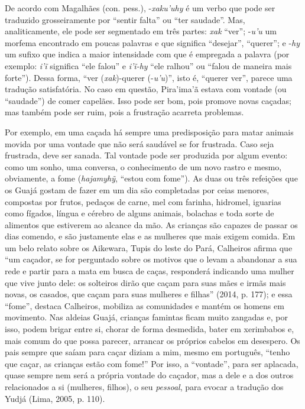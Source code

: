 De acordo com Magalhães (con. pess.), -\emph{xaku'uhy} é um verbo que
pode ser traduzido grosseiramente por ``sentir falta'' ou ``ter saudade''.
Mas, analiticamente, ele pode ser segmentado em três partes: \emph{xak}
``ver''; -\emph{u'u} um morfema encontrado em poucas palavras e que
significa ``desejar'', ``querer''; e -\emph{hy} um sufixo que indica a maior
intensidade com que é empregada a palavra (por exemplo: \emph{i'ĩ}
significa ``ele falou'' e \emph{i'ĩ-hy} ``ele ralhou'' ou ``falou de maneira
mais forte''). Dessa forma, ``ver (\emph{xak})-querer (-\emph{u'u})'', isto
é, ``querer ver'', parece uma tradução satisfatória. No caso em questão,
Pira'ima'ã estava com vontade (ou ``saudade'') de comer capelães. Isso
pode ser bom, pois promove novas caçadas; mas também pode ser ruim, pois
a frustração acarreta problemas.

Por exemplo, em uma caçada há sempre uma predisposição para matar
animais movida por uma vontade que não será saudável se for frustrada.
Caso seja frustrada, deve ser sanada. Tal vontade pode ser produzida por
algum evento: como um sonho, uma conversa, o conhecimento de um novo
rastro e mesmo, obviamente, a fome (\emph{hajamyhỹ}, ``estou com
fome''). As duas ou três refeições que os Guajá gostam de fazer em um
dia são completadas por ceias menores, compostas por frutos, pedaços de
carne, mel com farinha, hidromel, iguarias como fígados, língua e
cérebro de alguns animais, bolachas e toda sorte de alimentos que
estiverem ao alcance da mão. As crianças são capazes de passar os dias
comendo, e são justamente elas e as mulheres que mais exigem comida. Em
um belo relato sobre os Aikewara, Tupis do leste do Pará, Calheiros
afirma que ``um caçador, se for perguntado sobre os motivos que o levam
a abandonar a sua rede e partir para a mata em busca de caças,
responderá indicando uma mulher que vive junto dele: os solteiros dirão
que caçam para suas mães e irmãs mais novas, os casados, que caçam para
suas mulheres e filhas'' (2014, p. 177); e essa ``fome'', destaca
Calheiros, mobiliza as comunidades e mantém os homens em movimento. Nas
aldeias Guajá, crianças famintas ficam muito zangadas e, por isso, podem
brigar entre si, chorar de forma desmedida, bater em xerimbabos e, mais
comum do que possa parecer, arrancar os próprios cabelos em desespero.
Os pais sempre que saíam para caçar diziam a mim, mesmo em português,
``tenho que caçar, as crianças estão com fome!'' Por isso, a
``vontade'', para ser aplacada, quase sempre nem será a própria vontade
do caçador, mas a dele e a dos outros relacionados a si (mulheres,
filhos), o seu \emph{pessoal}, para evocar a tradução dos Yudjá (Lima,
2005, p. 110).

